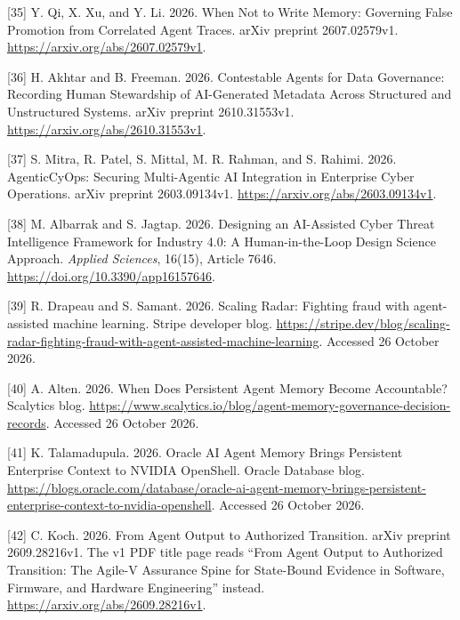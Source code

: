 \documentclass[
  11pt,
]{article}
\newlength{\cslhangindent}
\newlength{\cslentryspacingunit} %
\newenvironment{CSLReferences}[2] %
 {%
  \setlength{\parindent}{0pt}
  \ifodd #1
  \let\oldpar\par
  \def\par{\hangindent=\cslhangindent\oldpar}
  \fi
  \setlength{\parskip}{#2\cslentryspacingunit}
 }%
 {}
\begin{document}
\begin{CSLReferences}{1}{1}
\leavevmode{}%
{[}35{]} Y. Qi, X. Xu, and Y. Li. 2026. When Not to Write Memory:
Governing False Promotion from Correlated Agent Traces. arXiv preprint
2607.02579v1. \url{https://arxiv.org/abs/2607.02579v1}.

\leavevmode{}%
{[}36{]} H. Akhtar and B. Freeman. 2026. Contestable Agents for Data
Governance: Recording Human Stewardship of AI-Generated Metadata Across
Structured and Unstructured Systems. arXiv preprint 2610.31553v1.
\url{https://arxiv.org/abs/2610.31553v1}.

\leavevmode{}%
{[}37{]} S. Mitra, R. Patel, S. Mittal, M. R. Rahman, and S. Rahimi.
2026. AgenticCyOps: Securing Multi-Agentic AI Integration in Enterprise
Cyber Operations. arXiv preprint 2603.09134v1.
\url{https://arxiv.org/abs/2603.09134v1}.

\leavevmode{}%
{[}38{]} M. Albarrak and S. Jagtap. 2026. Designing an AI-Assisted Cyber
Threat Intelligence Framework for Industry 4.0: A Human-in-the-Loop
Design Science Approach. \emph{Applied Sciences}, 16(15), Article 7646.
\url{https://doi.org/10.3390/app16157646}.

\leavevmode{}%
{[}39{]} R. Drapeau and S. Samant. 2026. Scaling Radar: Fighting fraud
with agent-assisted machine learning. Stripe developer blog.
\url{https://stripe.dev/blog/scaling-radar-fighting-fraud-with-agent-assisted-machine-learning}.
Accessed 26 October 2026.

\leavevmode{}%
{[}40{]} A. Alten. 2026. When Does Persistent Agent Memory Become
Accountable? Scalytics blog.
\url{https://www.scalytics.io/blog/agent-memory-governance-decision-records}.
Accessed 26 October 2026.

\leavevmode{}%
{[}41{]} K. Talamadupula. 2026. Oracle AI Agent Memory Brings Persistent
Enterprise Context to NVIDIA OpenShell. Oracle Database blog.
\url{https://blogs.oracle.com/database/oracle-ai-agent-memory-brings-persistent-enterprise-context-to-nvidia-openshell}.
Accessed 26 October 2026.

\leavevmode{}%
{[}42{]} C. Koch. 2026. From Agent Output to Authorized Transition.
arXiv preprint 2609.28216v1. The v1 PDF title page reads ``From Agent
Output to Authorized Transition: The Agile-V Assurance Spine for
State-Bound Evidence in Software, Firmware, and Hardware Engineering''
instead. \url{https://arxiv.org/abs/2609.28216v1}.


\end{CSLReferences}
\end{document}
